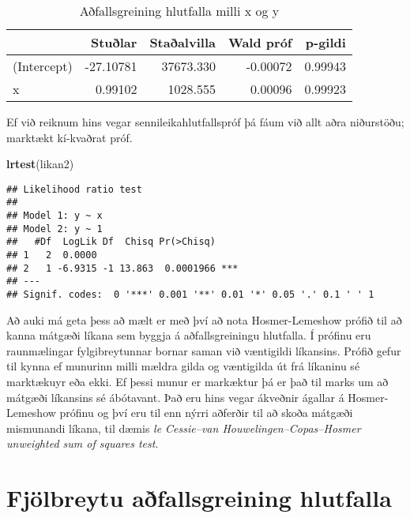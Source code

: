\documentclass[]{book}
\newenvironment{Shaded}{\begin{snugshade}}{\end{snugshade}}
\newcommand{\KeywordTok}[1]{\textcolor[rgb]{0.13,0.29,0.53}{\textbf{#1}}}
\newcommand{\NormalTok}[1]{#1}
\begin{document}
\begin{table}

\caption{\label{tab:taflaxy}Aðfallsgreining hlutfalla milli x og y}
\centering
\begin{tabular}[t]{l|r|r|r|r}
\hline
  & Stuðlar & Staðalvilla & Wald próf & p-gildi\\
\hline
(Intercept) & -27.10781 & 37673.330 & -0.00072 & 0.99943\\
\hline
x & 0.99102 & 1028.555 & 0.00096 & 0.99923\\
\hline
\end{tabular}
\end{table}

Ef við reiknum hins vegar sennileikahlutfallspróf þá fáum við allt aðra niðurstöðu; marktækt kí-kvaðrat próf.

\begin{Shaded}
\begin{Highlighting}[]
\KeywordTok{lrtest}\NormalTok{(likan2)}
\end{Highlighting}
\end{Shaded}

\begin{verbatim}
## Likelihood ratio test
## 
## Model 1: y ~ x
## Model 2: y ~ 1
##   #Df  LogLik Df  Chisq Pr(>Chisq)    
## 1   2  0.0000                         
## 2   1 -6.9315 -1 13.863  0.0001966 ***
## ---
## Signif. codes:  0 '***' 0.001 '**' 0.01 '*' 0.05 '.' 0.1 ' ' 1
\end{verbatim}

Að auki má geta þess að mælt er með því að nota Hosmer-Lemeshow prófið til að kanna mátgæði líkana sem byggja á aðfallsgreiningu hlutfalla. Í prófinu eru raunmælingar fylgibreytunnar bornar saman við væntigildi líkansins. Prófið gefur til kynna ef munurinn milli mældra gilda og væntigilda út frá líkaninu sé marktækuyr eða ekki. Ef þessi munur er markæktur þá er það til marks um að mátgæði líkansins sé ábótavant. Það eru hins vegar ákveðnir ágallar á Hosmer-Lemeshow prófinu og því eru til enn nýrri aðferðir til að skoða mátgæði mismunandi líkana, til dæmis \emph{le Cessie--van Houwelingen--Copas--Hosmer unweighted sum of squares test}.

\hypertarget{fjuxf6lbreytu-auxf0fallsgreining-hlutfalla}{%
\section{Fjölbreytu aðfallsgreining hlutfalla}\label{fjuxf6lbreytu-auxf0fallsgreining-hlutfalla}}
\end{document}
